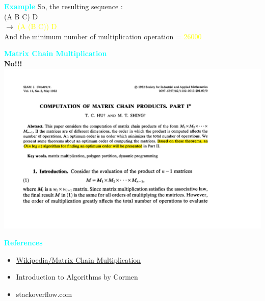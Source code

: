 \documentclass[algorithm,pgfplots]{cuzbeamer}
\begin{document}
\begin{frame}
    \begin{block}{\large{\textcolor{cyan}{\textbf{Example}}}}
    \vspace{1cm}
    So, the resulting sequence : \\
    (A B C) D \\
     $\rightarrow$ \textcolor{yellow}{(A (B C)) D}  \\
    And the minimum number of multiplication operation = \textcolor{yellow}{26000}
    
    
    \end{block}
        
\end{frame}    
    
    
\begin{frame}
\begin{block}{\large{\textcolor{cyan}{\textbf{Matrix Chain Multiplication}}}}
\vspace{0.5cm}
\centering
{}\\
\textbf{\alert {  No!!!}} \\
{\includegraphics[scale=0.25]{Paper.png}} \\
\end{block}

\end{frame} 

\begin{frame}
\begin{block}{\large{\textcolor{cyan}{\textbf{References}}}}
\vspace{3cm}
\begin{itemize}
    \item \href{https://en.wikipedia.org/wiki/Matrix_chain_multiplication}{Wikipedia/Matrix Chain Multiplication}
    \item Introduction to Algorithms by Cormen
    \item stackoverflow.com
\end{itemize}
\end{block}

    
\end{frame}
\end{document}
